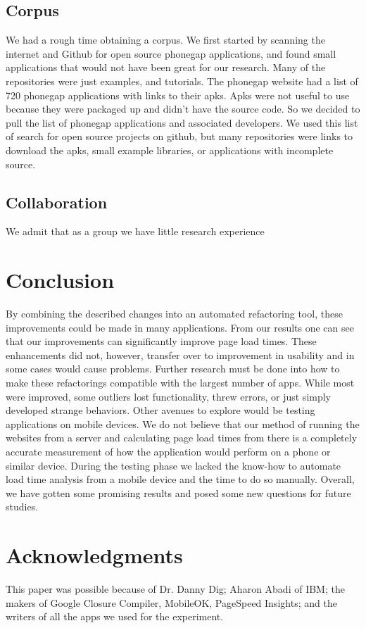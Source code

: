 \documentclass{acm_proc_article-sp}
\begin{document}
\subsection{Corpus}
We had a rough time obtaining a corpus. 
We first started by scanning the internet and Github for open source phonegap applications, and found small applications that would not have been great for our research. 
Many of the repositories were just examples, and tutorials. 
The phonegap website had a list of 720 phonegap applications with links to their apks. 
Apks were not useful to use because they were packaged up and didn't have the source code. 
So we decided to pull the list of phonegap applications and associated developers. 
We used this list of search for open source projects on github, but many repositories were links to download the apks, small example libraries, or applications with incomplete source. 

\subsection{Collaboration}
We admit that as a group we have little research experience

\section{Conclusion}
By combining the described changes into an automated refactoring tool, these improvements could be made in many applications.
From our results one can see that our improvements can significantly improve page load times.
These enhancements did not, however, transfer over to improvement in usability and in some cases would cause problems.
Further research must be done into how to make these refactorings compatible with the largest number of apps.
While most were improved, some outliers lost functionality, threw errors, or just simply developed strange behaviors.
Other avenues to explore would be testing applications on mobile devices.
We do not believe that our method of running the websites from a server and calculating page load times from there is a completely accurate measurement of how the application would perform on a phone or similar device.
During the testing phase we lacked the know-how to automate load time analysis from a mobile device and the time to do so manually.
Overall, we have gotten some promising results and posed some new questions for future studies.
\section{Acknowledgments}
This paper was possible because of Dr. Danny Dig; Aharon Abadi of IBM; the makers of Google Closure Compiler, MobileOK, PageSpeed Insights; and the writers of all the apps we used for the experiment.



\end{document}
